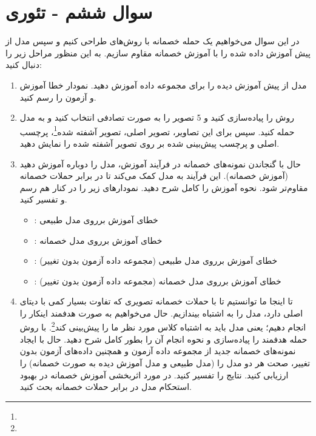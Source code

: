 \section{سوال ششم - تئوری}
در این سوال می‌خواهیم یک حمله خصمانه با روش‌های  طراحی کنیم و سپس مدل از پیش آموزش داده شده  را با آموزش خصمانه مقاوم سازیم. به این منظور مراحل زیر را دنبال کنید:


\begin{enumerate}
	\item 
مدل از پیش آموزش دیده  را برای مجموعه داده  آموزش دهید. نمودار خطا آموزش و آزمون را رسم کنید.

	\item 
روش  را پیاده‌سازی کنید و 5 تصویر را به صورت تصادفی انتخاب کنید و به مدل حمله کنید. سپس برای این تصاویر، تصویر اصلی، تصویر آشفته شده\footnote{}، پرچسب اصلی و پرچسب پیش‌بینی شده بر روی تصویر آشفته شده را نمایش دهید.


	\item 
حال با گنجاندن نمونه‌های خصمانه در فرآیند آموزش، مدل  را دوباره آموزش دهید (آموزش خصمانه). این فرآیند به مدل کمک می‌کند تا در برابر حملات خصمانه مقاوم‌تر شود. نحوه آموزش را کامل شرح دهید. نمودارهای زیر را در کنار هم رسم و تفسیر کنید.

	\begin{itemize}
		\item 
		: خطای آموزش برروی مدل طبیعی
		
		\item 
		: خطای آموزش برروی مدل خصمانه
		
		\item 
		: خطای آموزش برروی مدل طبیعی (مجموعه داده آزمون بدون تغییر)
		
		\item 
		: خطای آموزش برروی مدل خصمانه (مجموعه داده آزمون بدون تغییر)
	\end{itemize}
	
	
	\item 
تا اینجا ما توانستیم تا با حملات خصمانه تصویری که تفاوت بسیار کمی با دیتای اصلی دارد، مدل را به اشتباه بیندازیم. حال می‌خواهیم به صورت هدفمند اینکار را انجام دهیم؛ یعنی مدل باید به اشتباه کلاس مورد نظر ما را پیش‌بینی کند\footnote{}. با روش  حمله هدفمند را پیاده‌سازی و نحوه انجام آن را بطور کامل شرح دهید. حال با ایجاد نمونه‌های خصمانه جدید از مجموعه داده آزمون و همچنین داده‌های آزمون بدون تغییر، صحت هر دو مدل را (مدل طبیعی و مدل آموزش دیده به صورت خصمانه) را ارزیابی کنید. نتایج را تفسیر کنید. در مورد اثربخشی آموزش خصمانه در بهبود استحکام مدل در برابر حملات خصمانه بحث کنید.
\end{enumerate}





\begin{qsolve}

\end{qsolve}